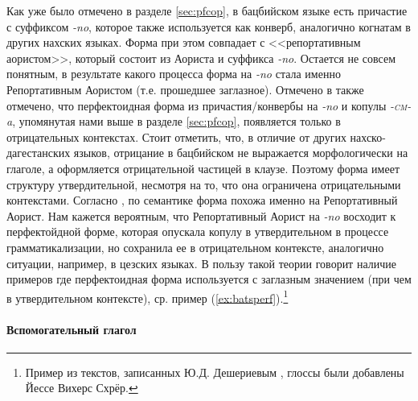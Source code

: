 \par Как уже было отмечено в разделе \ref{sec:pfcop}, в бацбийском языке есть причастие с суффиксом \textit{-no}, которое также используется как конверб, аналогично когнатам в других нахских языках. Форма при этом совпадает с <<репортативным аористом>>, который состоит из Аориста и суффикса \textit{-no}. Остается не совсем понятным, в результате какого процесса форма на \textit{-no} стала именно Репортативным Аористом (т.е. прошедшее заглазное). Отмечено в \citep{holiskygagua1994} также отмечено, что перфектоидная форма из причастия/конвербы на \textit{-no} и копулы \textit{-\textsc{cm}-a}, упомянутая нами выше в разделе \ref{sec:pfcop}, появляется только в отрицательных контекстах. Стоит отметить, что, в отличие от других нахско-дагестанских языков, отрицание в бацбийском не выражается морфологически на глаголе, а оформляется отрицательной частицей в клаузе. Поэтому форма имеет структуру утвердительной, несмотря на то, что она ограничена отрицательными контекстами. Согласно \citep{holiskygagua1994}, по семантике форма похожа именно на Репортативный Аорист. Нам кажется вероятным, что Репортативный Аорист на \textit{-no} восходит к перфектойдной форме, которая опускала копулу в утвердительном в процессе грамматикализации, но сохранила ее в отрицательном контексте, аналогично ситуации, например, в цезских языках. В пользу такой теории говорит наличие примеров где перфектоидная форма используется с заглазным значением (при чем в утвердительном контексте), ср. пример (\ref{ex:batsperf}).\footnote{Пример из текстов, записанных Ю.Д. Дешериевым \citep{desheriev1953}, глоссы были добавлены Йессе Вихерс Схрёр.}


\paragraph{Вспомогательный глагол} \label{sec:pfaux}

